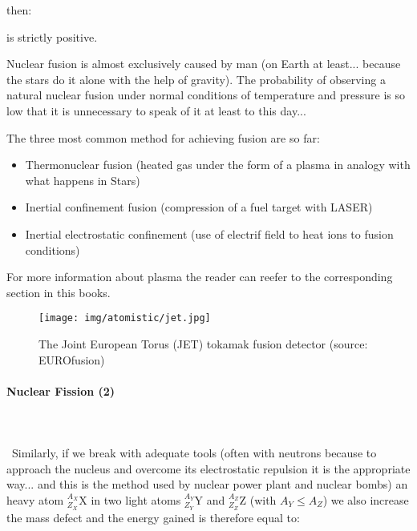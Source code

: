 	then:
	
	is strictly positive.
	
	Nuclear fusion is almost exclusively caused by man (on Earth at least... because the stars do it alone with the help of gravity). The probability of observing a natural nuclear fusion under normal conditions of temperature and pressure is so low that it is unnecessary to speak of it at least to this day...
	
	The three most common method for achieving fusion are so far:
	\begin{itemize}
		\item Thermonuclear fusion (heated gas under the form of a plasma in analogy with what happens in Stars)
		\item Inertial confinement fusion (compression of a fuel target with LASER)
		\item Inertial electrostatic confinement (use of electrif field to heat ions to fusion conditions)
	\end{itemize}
	For more information about plasma the reader can reefer to the corresponding section in this books.
	\begin{figure}[H]
		\centering
		\texttt{[image: img/atomistic/jet.jpg]}
		\caption{The Joint European Torus (JET) tokamak fusion detector (source: EUROfusion)}
	\end{figure}
	
	\paragraph{Nuclear Fission (2)}\mbox{}\\\\\
	Similarly, if we break with adequate tools (often with neutrons because to approach the nucleus and overcome its electrostatic repulsion it is the appropriate way... and this is the method used by nuclear power plant and nuclear bombs) an heavy atom $_{Z_X}^{A_X}\mathrm{X}$ in two light atoms $_{Z_Y}^{A_Y}\mathrm{Y}$ and $_{Z_Z}^{A_Z}\mathrm{Z}$ (with $A_Y\le A_Z$) we also increase the mass defect and the energy gained is therefore equal to:
	

